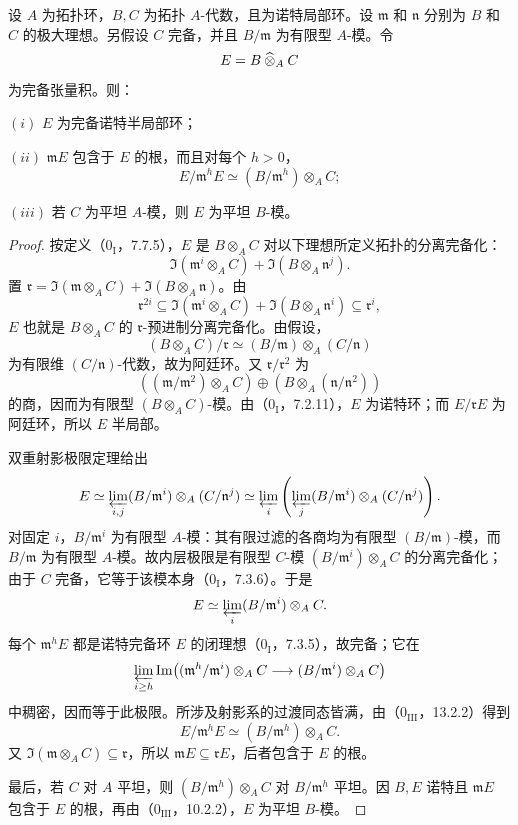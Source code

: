 设 $A$ 为拓扑环，$B,C$ 为拓扑 $A$-代数，且为诺特局部环。设 $\mathfrak m$ 和 $\mathfrak n$ 分别为 $B$ 和 $C$ 的极大理想。另假设 $C$ 完备，并且 $B/\mathfrak m$ 为有限型 $A$-模。令
\[
 E=B\ctensor_A C
\]
为完备张量积。则：

$(i)$ $E$ 为完备诺特半局部环；

$(ii)$ $\mathfrak mE$ 包含于 $E$ 的根，而且对每个 $h>0$，
\[
 E/\mathfrak m^hE\simeq(B/\mathfrak m^h)\otimes_A C;
\]

$(iii)$ 若 $C$ 为平坦 $A$-模，则 $E$ 为平坦 $B$-模。

\begin{proof}
按定义（$0_{\mathrm I}$，7.7.5），$E$ 是 $B\otimes_A C$ 对以下理想所定义拓扑的分离完备化：
\[
 \Im(\mathfrak m^i\otimes_A C)+\Im(B\otimes_A\mathfrak n^j).
\]
置 $\mathfrak r=\Im(\mathfrak m\otimes_A C)+\Im(B\otimes_A\mathfrak n)$。由
\[
 \mathfrak r^{2i}\subseteq
 \Im(\mathfrak m^i\otimes_A C)+\Im(B\otimes_A\mathfrak n^i)
 \subseteq\mathfrak r^i,
\]
$E$ 也就是 $B\otimes_A C$ 的 $\mathfrak r$-预进制分离完备化。由假设，
\[
 (B\otimes_A C)/\mathfrak r
 \simeq (B/\mathfrak m)\otimes_A(C/\mathfrak n)
\]
为有限维 $(C/\mathfrak n)$-代数，故为阿廷环。又 $\mathfrak r/\mathfrak r^2$ 为
\[
 ((\mathfrak m/\mathfrak m^2)\otimes_A C)
 \oplus(B\otimes_A(\mathfrak n/\mathfrak n^2))
\]
的商，因而为有限型 $(B\otimes_A C)$-模。由（$0_{\mathrm I}$，7.2.11），$E$ 为诺特环；而 $E/\mathfrak rE$ 为阿廷环，所以 $E$ 半局部。

双重射影极限定理给出
\[
 E\simeq\varprojlim_{i,j}(B/\mathfrak m^i)\otimes_A(C/\mathfrak n^j)
 \simeq\varprojlim_i\left(\varprojlim_j
 (B/\mathfrak m^i)\otimes_A(C/\mathfrak n^j)\right).
\]
对固定 $i$，$B/\mathfrak m^i$ 为有限型 $A$-模：其有限过滤的各商均为有限型 $(B/\mathfrak m)$-模，而 $B/\mathfrak m$ 为有限型 $A$-模。故内层极限是有限型 $C$-模 $(B/\mathfrak m^i)\otimes_A C$ 的分离完备化；由于 $C$ 完备，它等于该模本身（$0_{\mathrm I}$，7.3.6）。于是
\[
 E\simeq\varprojlim_i (B/\mathfrak m^i)\otimes_A C.
\]
每个 $\mathfrak m^hE$ 都是诺特完备环 $E$ 的闭理想（$0_{\mathrm I}$，7.3.5），故完备；它在
\[
 \varprojlim_{i\ge h}\Im\bigl((\mathfrak m^h/\mathfrak m^i)\otimes_A C
          \longrightarrow(B/\mathfrak m^i)\otimes_A C\bigr)
\]
中稠密，因而等于此极限。所涉及射影系的过渡同态皆满，由（$0_{\mathrm{III}}$，13.2.2）得到
\[
 E/\mathfrak m^hE\simeq(B/\mathfrak m^h)\otimes_A C.
\]
又 $\Im(\mathfrak m\otimes_A C)\subseteq\mathfrak r$，所以 $\mathfrak mE\subseteq\mathfrak rE$，后者包含于 $E$ 的根。

最后，若 $C$ 对 $A$ 平坦，则 $(B/\mathfrak m^h)\otimes_A C$ 对 $B/\mathfrak m^h$ 平坦。因 $B,E$ 诺特且 $\mathfrak mE$ 包含于 $E$ 的根，再由（$0_{\mathrm{III}}$，10.2.2），$E$ 为平坦 $B$-模。
\end{proof}

